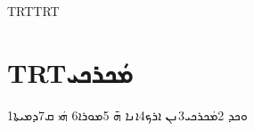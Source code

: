 \documentclass{scrartcl}
\newcommand{\textsyriac}[1] %
{\bgroup\luatextextdir TRT\syriacfont #1\egroup}
\newenvironment{syriac} %
{\luatextextdir TRT\luatexpardir TRT\syriacfont}{}
\begin{document}
\begin{syriac}
\section{\textsyriac{ܡܿܟܪܟܝ}}

1ܘܟܕ 2ܡܿܟܪܟܝ3ܢܢ ܐܪܟ4ܐܢܐ ܗ̄ 5ܡܘܪܐ6 ܗܿܝ ܩ7ܕܡܝܬܐ

\end{syriac}
\end{document}
